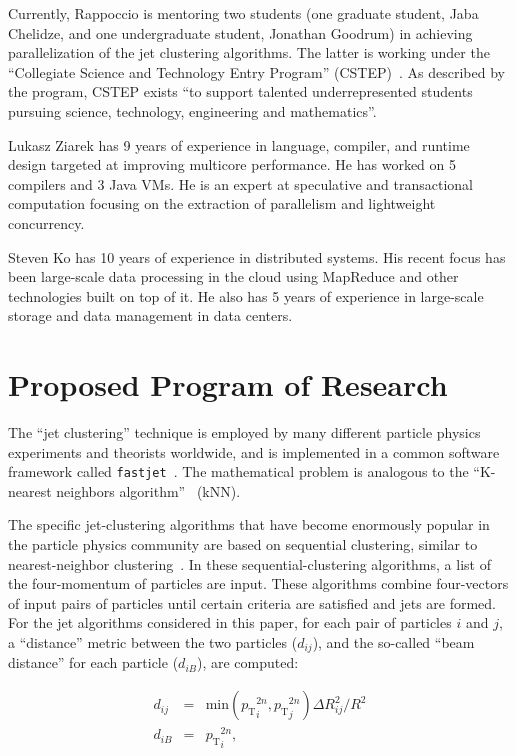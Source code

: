 \documentclass[times,11pt]{article}
\newcommand{\pt}            {\ensuremath{p_{\mathrm{T}}}\xspace}
\begin{document}
Currently, Rappoccio is mentoring two students (one graduate student,
Jaba Chelidze, and one undergraduate student, Jonathan Goodrum) in
achieving parallelization of the jet clustering algorithms. The latter
is working under the ``Collegiate Science and Technology Entry
Program'' (CSTEP)~\cite{cstep}. As described by the program, CSTEP
exists ``to support talented underrepresented students pursuing
science, technology, engineering and mathematics''. 


Lukasz Ziarek has 9 years of experience in language, compiler,
and runtime design targeted at improving multicore performance.  He
has worked on 5 compilers and 3 Java VMs. He is an expert at
speculative and transactional computation focusing on the extraction
of parallelism and lightweight concurrency. 



Steven Ko has 10 years of experience in distributed systems. His
recent focus has been large-scale data processing in the cloud using
MapReduce and other technologies built on top of it. He also has 5
years of experience in large-scale storage and data management in
data centers.


\section{Proposed Program of Research}


The
``jet clustering'' technique is employed by
many different particle physics experiments and theorists worldwide, and is
implemented in a common software framework called 
{\tt fastjet}~\cite{fastjet_manual}. 
The mathematical problem is analogous to the
``K-nearest neighbors algorithm''~\cite{knn_ieee} (kNN). 


The specific jet-clustering algorithms that have become enormously
popular in the particle physics community are based on sequential
clustering, similar to nearest-neighbor
clustering~\cite{fastjet_timing}. In these sequential-clustering
algorithms, a list of the four-momentum of particles are input. 
These algorithms combine four-vectors of input pairs of particles 
until certain criteria are satisfied and jets are formed. 
For the jet algorithms considered in this paper, for each pair of particles $i$ and $j$,
a ``distance'' metric between
the two particles ($d_{ij}$), and the so-called ``beam distance''
for each particle ($d_{iB}$), are computed:



\begin{eqnarray}
\label{eq:dij}
d_{ij} &=& \mathrm{min}({\pt}_i^{2n},{\pt}_j^{2n}) \Delta R_{ij}^2 / R^2 \\
\label{eq:diB}
d_{iB} &=& {\pt}_i^{2n}, 
\end{eqnarray}
\end{document}
